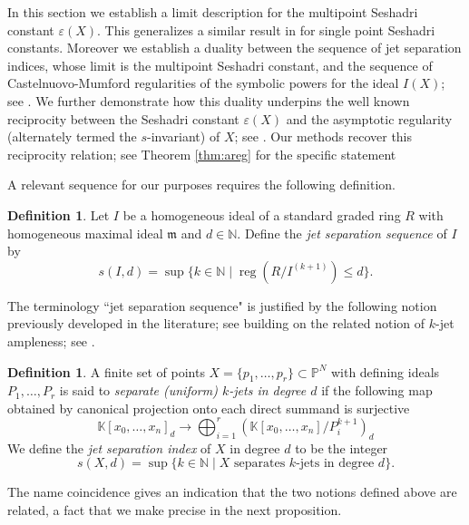 \documentclass[12pt, reqno]{amsart}
\numberwithin{equation}{section}
\def\e{\ensuremath{\varepsilon}}
\newcommand{\fm}{{\mathfrak m}}
\newcommand{\N}{{\mathbb N}}
\newcommand{\kk}{\mathbb{K}}
\DeclareMathOperator{\reg}{reg}
\theoremstyle{plain} %
\theoremstyle{definition}
\newtheorem{defn}[thm]{Definition}
\theoremstyle{remark}
\begin{document}
 In this section we establish a limit description for the multipoint Seshadri constant $\e(X)$. This generalizes a similar result in \cite[Theorem 5.1.17]{Laz04} for single point Seshadri constants. Moreover we establish a duality between the sequence of jet separation indices, whose limit is the multipoint Seshadri constant, and the sequence of Castelnuovo-Mumford regularities of the symbolic powers for the ideal $I(X)$; see . We further demonstrate how this duality underpins the well known reciprocity between the Seshadri constant $\e(X)$ and the asymptotic regularity (alternately termed the $s$-invariant) of $X$; see \cite[Remark 5.4.3]{Laz04}. Our methods recover this reciprocity relation; see Theorem \ref{thm:areg} for the specific statement %
 
A relevant sequence for our purposes requires the following definition.

\begin{defn}
\label{def:genjets}
Let $I$ be a homogeneous ideal of a standard graded ring $R$ with homogeneous maximal ideal $\fm$ and $d\in \N$. Define the {\em jet separation sequence} of $I$ by
\[
s(I,d)=\sup\{k \in \N\mid \reg(R/I^{(k+1)})\leq d\}.
\] 
\end{defn}

The terminology ``jet separation sequence" is justified by the following notion previously developed in the literature; see \cite[Definitions 5.1.15 and 5.1.16]{Laz04} building on the related notion of $k$-jet ampleness; see \cite{BS}.

\begin{defn}
\label{def:jets}
A finite set of points  $X=\{p_1,\ldots, p_r\}\subset \mathbb{P}^N$ with defining ideals $P_1, \ldots, P_r$ is said to {\em separate (uniform) $k$-jets in degree $d$} if the following  map  obtained by canonical projection onto each direct summand is surjective \begin{equation}
\label{eq:jetsep}
\kk[x_0,\ldots,x_n]_d \to \bigoplus_{i=1}^r \left(\kk[x_0,\ldots,x_n]/P_i^{k+1}\right)_d
\end{equation}
We define the {\em  jet separation index} of $X$ in degree $d$ to be the integer
\[
s(X,d)=\sup\{ k \in \N \mid X \text{ separates } k\text{-jets in degree } d\}.
\]
\end{defn}

The name coincidence gives an indication that the two notions defined above are related, a fact that we make precise in the next proposition.
\end{document}
